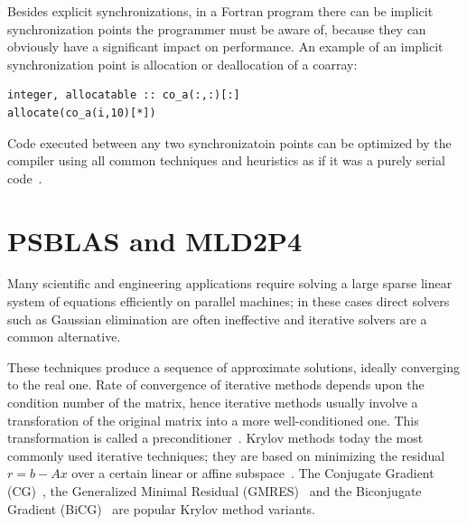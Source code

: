 \documentclass{IOS-Book-Article}
\begin{document}
Besides  explicit synchronizations, in a Fortran program there can be
implicit synchronization points the programmer must be aware of, 
because they can obviously have a significant impact on  performance. 
An example of an implicit synchronization point is allocation or
deallocation of a coarray: 
\begin{lstlisting}
integer, allocatable :: co_a(:,:)[:]
allocate(co_a(i,10)[*])
\end{lstlisting}
Code executed between any two synchronizatoin points can be optimized
by the  compiler using all common techniques and heuristics  as if
it was a purely serial code~\cite{CAF}. 

\section{PSBLAS and MLD2P4}

Many  scientific and engineering applications require solving a
large sparse linear system of equations efficiently on parallel
machines;  in these cases direct solvers such as Gaussian elimination
are often ineffective and iterative solvers are a common alternative.

These techniques produce a sequence of approximate solutions, ideally
converging to the real one. Rate of convergence of iterative methods
depends upon the condition number of the matrix, hence iterative
methods usually involve a transforation of the original matrix into a
more well-conditioned one. This transformation is called a
preconditioner~\cite{barrett1994templates}. Krylov methods today the
most commonly used iterative techniques; they are based on minimizing
the residual $r=b-Ax$ over a certain linear or affine 
subspace~\cite{ipsen1998idea}. The Conjugate Gradient 
(CG)~\cite{shewchuk1994introduction}, the Generalized Minimal Residual  
(GMRES)~\cite{saad1986gmres} and the Biconjugate Gradient
(BiCG)~\cite{van1992bi} are popular Krylov method variants.
\end{document}
